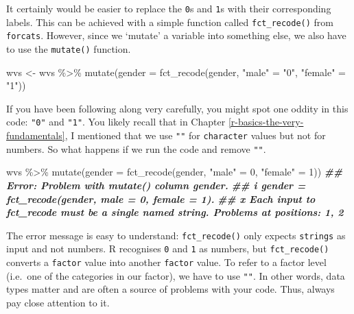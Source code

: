 \documentclass[
]{book}
\newenvironment{Shaded}{\begin{snugshade}}{\end{snugshade}}
\newcommand{\AttributeTok}[1]{\textcolor[rgb]{0.77,0.63,0.00}{#1}}
\newcommand{\DecValTok}[1]{\textcolor[rgb]{0.00,0.00,0.81}{#1}}
\newcommand{\DocumentationTok}[1]{\textcolor[rgb]{0.56,0.35,0.01}{\textbf{\textit{#1}}}}
\newcommand{\FunctionTok}[1]{\textcolor[rgb]{0.00,0.00,0.00}{#1}}
\newcommand{\NormalTok}[1]{#1}
\newcommand{\OtherTok}[1]{\textcolor[rgb]{0.56,0.35,0.01}{#1}}
\newcommand{\SpecialCharTok}[1]{\textcolor[rgb]{0.00,0.00,0.00}{#1}}
\newcommand{\StringTok}[1]{\textcolor[rgb]{0.31,0.60,0.02}{#1}}
\begin{document}
It certainly would be easier to replace the \texttt{0}s and \texttt{1}s with their corresponding labels. This can be achieved with a simple function called \texttt{fct\_recode()} from \texttt{forcats}. However, since we `mutate' a variable into something else, we also have to use the \texttt{mutate()} function.

\begin{Shaded}
\begin{Highlighting}[]
\NormalTok{wvs }\OtherTok{\textless{}{-}}
\NormalTok{  wvs }\SpecialCharTok{\%\textgreater{}\%}
  \FunctionTok{mutate}\NormalTok{(}\AttributeTok{gender =} \FunctionTok{fct\_recode}\NormalTok{(gender, }\StringTok{"male"} \OtherTok{=} \StringTok{"0"}\NormalTok{, }\StringTok{"female"} \OtherTok{=} \StringTok{"1"}\NormalTok{))}
\end{Highlighting}
\end{Shaded}

If you have been following along very carefully, you might spot one oddity in this code: \texttt{"0"} and \texttt{"1"}. You likely recall that in Chapter \ref{r-basics-the-very-fundamentals}, I mentioned that we use \texttt{""} for \texttt{character} values but not for numbers. So what happens if we run the code and remove \texttt{""}.

\begin{Shaded}
\begin{Highlighting}[]
\NormalTok{wvs }\SpecialCharTok{\%\textgreater{}\%}
  \FunctionTok{mutate}\NormalTok{(}\AttributeTok{gender =} \FunctionTok{fct\_recode}\NormalTok{(gender, }\StringTok{"male"} \OtherTok{=} \DecValTok{0}\NormalTok{, }\StringTok{"female"} \OtherTok{=} \DecValTok{1}\NormalTok{))}
\DocumentationTok{\#\# Error: Problem with \textasciigrave{}mutate()\textasciigrave{} column \textasciigrave{}gender\textasciigrave{}.}
\DocumentationTok{\#\# i \textasciigrave{}gender = fct\_recode(gender, male = 0, female = 1)\textasciigrave{}.}
\DocumentationTok{\#\# x Each input to fct\_recode must be a single named string. Problems at positions: 1, 2}
\end{Highlighting}
\end{Shaded}

The error message is easy to understand: \texttt{fct\_recode()} only expects \texttt{strings} as input and not numbers. R recognises \texttt{0} and \texttt{1} as numbers, but \texttt{fct\_recode()} converts a \texttt{factor} value into another \texttt{factor} value. To refer to a factor level (i.e.~one of the categories in our factor), we have to use \texttt{""}. In other words, data types matter and are often a source of problems with your code. Thus, always pay close attention to it.
\end{document}
